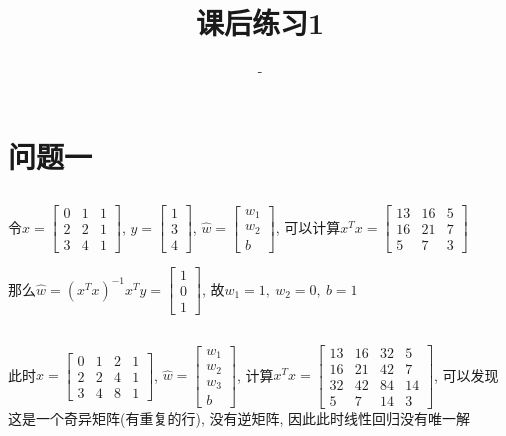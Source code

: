 \documentclass[12pt, a4paper]{article}
\title{课后练习1}
\author{-}
\begin{document}
\maketitle %

\section{问题一}

\subsection{}

令$x = \begin{bmatrix}
    0 & 1 & 1 \\
    2 & 2 & 1 \\
    3 & 4 & 1
\end{bmatrix}$, $y = \begin{bmatrix}
    1 \\ 3 \\ 4
\end{bmatrix}$, $\hat{w} = \begin{bmatrix}
    w_1 \\ w_2 \\ b
\end{bmatrix}$, 可以计算$x^T x = \begin{bmatrix}
    13 & 16 & 5\\
    16 & 21 & 7 \\
    5 & 7 & 3
\end{bmatrix}$


那么$\hat{w} = (x^T x)^{-1}x^T y = \begin{bmatrix}
    1 \\
    0 \\
    1
\end{bmatrix}$, 故$w_1 = 1, \ w_2 = 0, \ b = 1$

\subsection{}

此时$x = \begin{bmatrix}
    0&1&2&1\\
    2&2&4&1\\
    3&4&8&1
\end{bmatrix}$, $\hat{w} = \begin{bmatrix}
    w_1\\w_2\\w_3\\b
\end{bmatrix}$, 计算$x^Tx = \begin{bmatrix}
    13&16&32&5\\
    16&21&42&7\\
    32&42&84&14\\
    5&7&14&3
\end{bmatrix}$, 可以发现这是一个奇异矩阵(有重复的行), 没有逆矩阵, 因此此时线性回归没有唯一解
\end{document}
